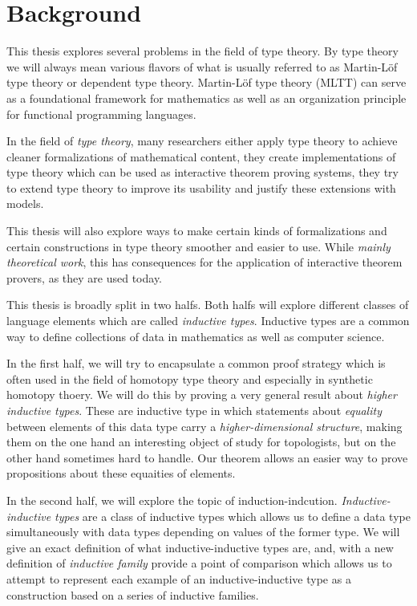 \section{Background}

This thesis explores several problems in the field of type theory.
By type theory we will always mean various flavors of what is usually
referred to as Martin-Löf type theory or dependent type theory.
Martin-Löf type theory (MLTT) can serve as a foundational framework for
mathematics as well as an organization principle for functional programming languages.

In the field of \emph{type theory}, many researchers either apply type theory to
achieve cleaner formalizations of mathematical content,
they create implementations of type theory which can be used as
interactive theorem proving systems, they try to extend type
theory to improve its usability and justify these extensions with models.

This thesis will also explore ways to make certain kinds of formalizations
and certain constructions in type theory smoother and easier to use.
While \emph{mainly theoretical work}, this has consequences for the application of
interactive theorem provers, as they are used today.

This thesis is broadly split in two halfs.
Both halfs will explore different classes of language elements which are
called \emph{inductive types}.
Inductive types are a common way to define collections of data in mathematics
as well as computer science.

In the first half, we will try to encapsulate a common proof strategy which
is often used in the field of homotopy type theory and especially in
synthetic homotopy thoery.
We will do this by
proving a very general result about \emph{higher inductive types}.
These are inductive type in which statements about \emph{equality} between
elements of this data type carry a \emph{higher-dimensional structure},
making them on the one hand an interesting object of study for topologists,
but on the other hand sometimes hard to handle.
Our theorem allows an easier way to prove propositions about these
equaities of elements.

In the second half, we will explore the topic of induction-indcution.
\emph{Inductive-inductive types} are a class of inductive types which
allows us to define a data type simultaneously with data types depending on
values of the former type.
We will give an exact definition of what inductive-inductive types are,
and, with a new definition of \emph{inductive family} provide a point of
comparison which allows us to attempt to represent each example of
an inductive-inductive type as a construction based on a series of
inductive families.

